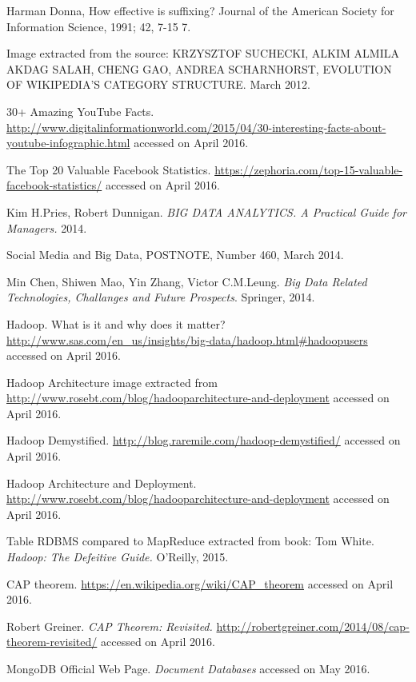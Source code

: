 \begin{thebibliography}{99999}
 Harman Donna, How effective is suffixing?
Journal of the American Society for Information Science, 1991; 42, 7-15 7.

 Image extracted from the source: KRZYSZTOF SUCHECKI, ALKIM ALMILA AKDAG SALAH, CHENG GAO, ANDREA SCHARNHORST, EVOLUTION OF WIKIPEDIA’S CATEGORY STRUCTURE. March 2012.

 30+ Amazing YouTube Facts. \url{http://www.digitalinformationworld.com/2015/04/30-interesting-facts-about-youtube-infographic.html} accessed on April 2016.

 The Top 20 Valuable Facebook Statistics. \url{https://zephoria.com/top-15-valuable-facebook-statistics/} accessed on April 2016.

 Kim H.Pries, Robert Dunnigan. \textit{BIG DATA ANALYTICS. A Practical Guide for Managers.} 2014.

 Social Media and Big Data, POSTNOTE, Number 460, March 2014.

 Min Chen, Shiwen Mao, Yin Zhang, Victor C.M.Leung. \textit{Big Data Related Technologies, Challanges and Future Prospects}. Springer, 2014.

 Hadoop. What is it and why does it matter? \url{http://www.sas.com/en_us/insights/big-data/hadoop.html#hadoopusers} accessed on April 2016.

 Hadoop Architecture image extracted from \url{http://www.rosebt.com/blog/hadooparchitecture-and-deployment} accessed on April 2016.

 Hadoop Demystified. \url{http://blog.raremile.com/hadoop-demystified/} accessed on April 2016.

 Hadoop Architecture and Deployment. \url{http://www.rosebt.com/blog/hadooparchitecture-and-deployment} accessed on April 2016.

 Table RDBMS compared to MapReduce extracted from book: Tom White. \textit{Hadoop: The Defeitive Guide.} O'Reilly, 2015.

 CAP theorem. \url{https://en.wikipedia.org/wiki/CAP_theorem} accessed on April 2016.

 Robert Greiner. \textit{CAP Theorem: Revisited.} \url{http://robertgreiner.com/2014/08/cap-theorem-revisited/} accessed on April 2016.

 MongoDB Official Web Page. \textit{Document Databases} accessed on May 2016.


\end{thebibliography}
